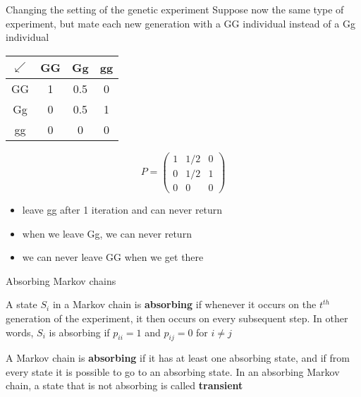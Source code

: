 \documentclass[aspectratio=169]{beamer}\usepackage[]{graphicx}\usepackage[]{xcolor}
\begin{document}
\begin{frame}{Changing the setting of the genetic experiment}
Suppose now the same type of experiment, but mate each new generation with a GG individual instead of a Gg individual
\vfill
\begin{center}
\end{center}
\vfill
\begin{minipage}{0.45\textwidth}
	\begin{center}
		\begin{tabular}{c|ccc}
		$\swarrow$ & GG & Gg & gg \\
		\hline
		GG & 1 & 0.5 & 0 \\
		Gg & 0 & 0.5 & 1 \\
		gg & 0 & 0 & 0
		\end{tabular}
	\end{center}
\end{minipage}
\begin{minipage}{0.45\textwidth}
	\[
		P=\begin{pmatrix}
		1 & 1/2 & 0 \\[5pt]
		0 & 1/2 & 1 \\[5pt]
		0 & 0 & 0
		\end{pmatrix}
	\]
\end{minipage}
\begin{itemize}
\item leave gg after 1 iteration and can never return
\item when we leave Gg, we can never return
\item we can never leave GG when we get there
\end{itemize}
\end{frame}


\begin{frame}{Absorbing Markov chains}
\begin{definition}
A state $S_i$ in a Markov chain is \textbf{absorbing} if whenever it occurs on the $t^{th}$ generation of the experiment, it then occurs on every subsequent step. In other words, $S_i$ is absorbing if $p_{ii}=1$ and $p_{ij}=0$ for $i\neq j$
\end{definition}
\vfill
\begin{definition}
A Markov chain is \textbf{absorbing} if it has at least one absorbing state, and if from every state it is possible to go to an absorbing state.
In an absorbing Markov chain, a state that is not absorbing is called \textbf{transient}
\end{definition}
\end{frame}
\end{document}
